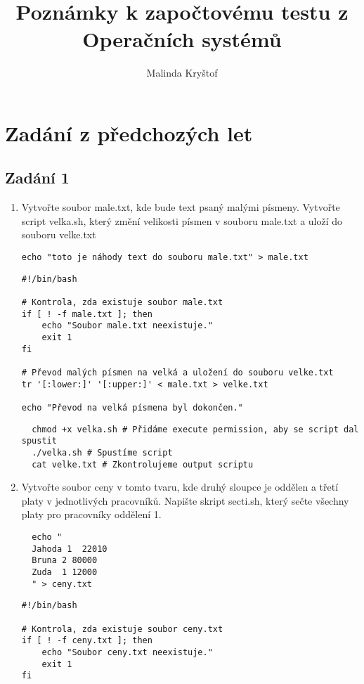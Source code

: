 \documentclass{article}
\title{Poznámky k započtovému testu z Operačních systémů}
\author{Malinda Kryštof}
\begin{document}
\maketitle


\section{Zadání z předchozých let}
\subsection{Zadání 1}
\begin{enumerate}
  \item Vytvořte soubor male.txt, kde bude text psaný malými písmeny. Vytvořte script velka.sh, který změní velikosti písmen v souboru male.txt a uloží do souboru velke.txt
\begin{lstlisting}[caption=Vytvoříme soubor male.txt]
  echo "toto je náhody text do souboru male.txt" > male.txt
\end{lstlisting}
\begin{lstlisting}[caption=Jak by měl vypadat velka.sh]
#!/bin/bash

# Kontrola, zda existuje soubor male.txt
if [ ! -f male.txt ]; then
    echo "Soubor male.txt neexistuje."
    exit 1
fi

# Převod malých písmen na velká a uložení do souboru velke.txt
tr '[:lower:]' '[:upper:]' < male.txt > velke.txt

echo "Převod na velká písmena byl dokončen."
\end{lstlisting}
\begin{lstlisting}
  chmod +x velka.sh # Přidáme execute permission, aby se script dal spustit
  ./velka.sh # Spustíme script
  cat velke.txt # Zkontrolujeme output scriptu
\end{lstlisting}
  \item Vytvořte soubor ceny v tomto tvaru, kde druhý sloupce je oddělen a třetí platy v jednotlivých pracovníků. Napište skript secti.sh, který sečte všechny platy pro pracovníky oddělení 1.
\begin{lstlisting}
  echo "
  Jahoda 1  22010
  Bruna 2 80000
  Zuda  1 12000
  " > ceny.txt
\end{lstlisting}
\begin{lstlisting}[caption=skript secti.sh]
#!/bin/bash

# Kontrola, zda existuje soubor ceny.txt
if [ ! -f ceny.txt ]; then
    echo "Soubor ceny.txt neexistuje."
    exit 1
fi


\end{lstlisting}
\end{enumerate}
\end{document}
